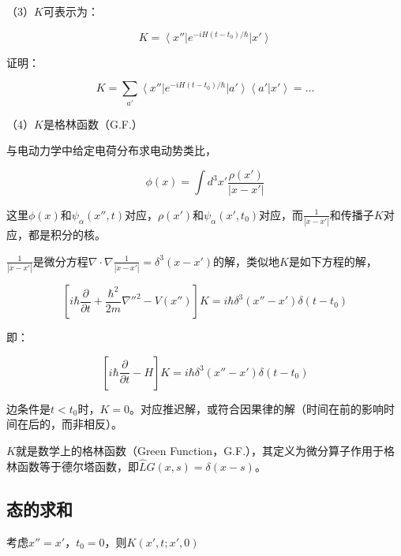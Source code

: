 （3）$K$可表示为：

\begin{equation}
K = \left\langle x'' \right| e^{- i H (t - t_0) / \hbar}  \left| x' \right\rangle  
\end{equation}

证明：

\begin{equation*}
K = \sum\limits_{a'} \left\langle x'' \right| e^{- i H (t - t_0) / \hbar} \left| a' \right\rangle \left\langle a' | x' \right\rangle = ...  
\end{equation*}

（4）$K$是格林函数（G.F.）

与电动力学中给定电荷分布求电动势类比，

\begin{equation}
\phi(x) = \int d^3 x' \frac{\rho (x')}{ \left| x - x' \right| }
\end{equation}

这里$\phi(x)$和$\psi_\alpha (x'', t)$对应，$\rho(x')$和$\psi_\alpha (x', t_0)$对应，而$\frac{1}{ \left| x - x' \right| }$和传播子$K$对应，都是积分的核。

$\frac{1}{ \left| x - x' \right| }$是微分方程$\nabla \cdot \nabla \frac{1}{ \left| x - x' \right| }  = \delta^3 (x- x')$的解，类似地$K$是如下方程的解，

\begin{equation}
\left[ i \hbar \frac{\partial }{\partial t} + \frac{\hbar^2}{ 2m} \nabla''^2 - V(x'')  \right] K = i \hbar \delta^3 (x'' - x') \delta (t - t_0)
\end{equation}

即：

\begin{equation}
\left[ i \hbar \frac{\partial }{\partial t} - H \right] K = i \hbar \delta^3 (x'' - x') \delta (t - t_0) 
\end{equation}

边条件是$t < t_0$时，$K = 0$。对应推迟解，或符合因果律的解（时间在前的影响时间在后的，而非相反）。

$K$就是数学上的格林函数（Green Function，G.F.），其定义为微分算子作用于格林函数等于德尔塔函数，即$\hat L G(x,s) = \delta(x-s)$。

\subsection{态的求和}

考虑$x'' = x'$，$t_0 = 0$，则$K (x', t ; x', 0)$

